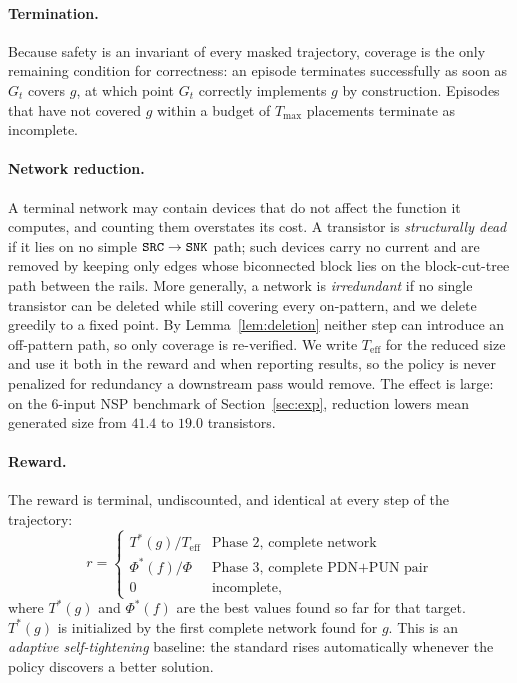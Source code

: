 \paragraph{Termination.}
Because safety is an invariant of every masked trajectory, coverage is the
only remaining condition for correctness: an episode terminates successfully
as soon as $G_t$ covers $g$, at which point $G_t$ correctly implements $g$ by
construction.  Episodes that have not covered $g$ within a budget of
$T_{\max}$ placements terminate as incomplete.

\paragraph{Network reduction.}
\label{sec:reduction}
A terminal network may contain devices that do not affect the function it
computes, and counting them overstates its cost.
A transistor is \emph{structurally dead} if it lies on no simple
$\texttt{SRC} \to \texttt{SNK}$ path; such devices carry no current and are removed by keeping
only edges whose biconnected block lies on the block-cut-tree path between the
rails.  More generally, a network is \emph{irredundant} if no single
transistor can be deleted while still covering every on-pattern, and we delete
greedily to a fixed point.
By Lemma~\ref{lem:deletion} neither step can introduce an off-pattern path, so
only coverage is re-verified.
We write $T_{\mathrm{eff}}$ for the reduced size and use it both in the reward
and when reporting results, so the policy is never penalized for redundancy a
downstream pass would remove.  The effect is large: on the $6$-input NSP
benchmark of Section~\ref{sec:exp}, reduction lowers mean generated size from
$41.4$ to $19.0$ transistors.

\paragraph{Reward.}
The reward is terminal, undiscounted, and identical at every step of the
trajectory:
\begin{equation}
  r = \begin{cases}
    T^*(g) / T_{\mathrm{eff}} & \text{Phase 2, complete network}\\
    \Phi^*(f) / \Phi          & \text{Phase 3, complete PDN+PUN pair}\\
    0                         & \text{incomplete,}
  \end{cases}
  \label{eq:reward}
\end{equation}
where $T^*(g)$ and $\Phi^*(f)$ are the best values found so far for that
target.  $T^*(g)$ is initialized by the first complete network found for $g$. This is an \emph{adaptive self-tightening} baseline: the standard
rises automatically whenever the policy discovers a better solution.



